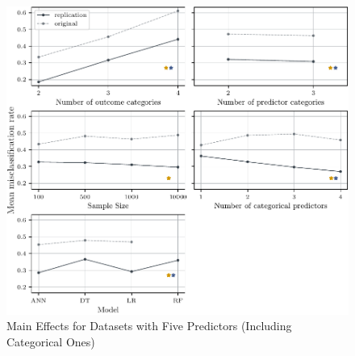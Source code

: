 \documentclass[12pt]{article}
\begin{document}
\begin{figure}[h]
    \centering
    \includegraphics{fig/09_mainEffects_V5.pdf}
    \caption{Main Effects for Datasets with Five Predictors (Including Categorical Ones)}
    \label{fig:09_mainEffects_V5}
\end{figure}
\end{document}
